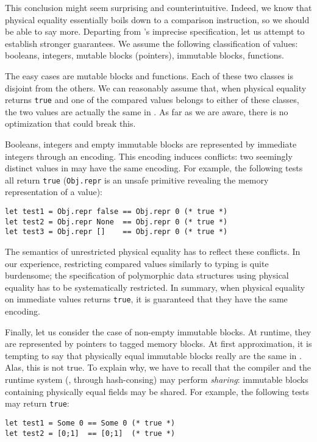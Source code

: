 This conclusion might seem surprising and counterintuitive.
Indeed, we know that physical equality essentially boils down to a comparison instruction, so we should be able to say more.
Departing from \OCaml's imprecise specification, let us attempt to establish stronger guarantees.
We assume the following classification of values: booleans, integers, mutable blocks (pointers), immutable blocks, functions.

The easy cases are mutable blocks and functions.
Each of these two classes is disjoint from the others.
We can reasonably assume that, when physical equality returns \texttt{true} and one of the compared values belongs to either of these classes, the two values are actually the same in \Rocq.
As far as we are aware, there is no optimization that could break this.

Booleans, integers and empty immutable blocks are represented by immediate integers through an encoding.
This encoding induces conflicts: two seemingly distinct values in \Rocq may have the same encoding.
For example, the following tests all return \texttt{true} (\texttt{Obj.repr} is an unsafe primitive revealing the memory representation of a value):
\begin{verbatim}
let test1 = Obj.repr false == Obj.repr 0 (* true *)
let test2 = Obj.repr None  == Obj.repr 0 (* true *)
let test3 = Obj.repr []    == Obj.repr 0 (* true *)
\end{verbatim}

The semantics of unrestricted physical equality has to reflect these conflicts.
In our experience, restricting compared values similarly to typing is quite burdensome; the specification of polymorphic data structures using physical equality has to be systematically restricted.
In summary, when physical equality on immediate values returns \texttt{true}, it is guaranteed that they have the same encoding.

Finally, let us consider the case of non-empty immutable blocks.
At runtime, they are represented by pointers to tagged memory blocks.
At first approximation, it is tempting to say that physically equal immutable blocks really are the same in \Rocq.
Alas, this is not true.
To explain why, we have to recall that the \OCaml compiler and the runtime system (\eg, through hash-consing) may perform \emph{sharing}: immutable blocks containing physically equal fields may be shared.
For example, the following tests may return \texttt{true}:
\begin{verbatim}
let test1 = Some 0 == Some 0 (* true *)
let test2 = [0;1]  == [0;1]  (* true *)
\end{verbatim}

